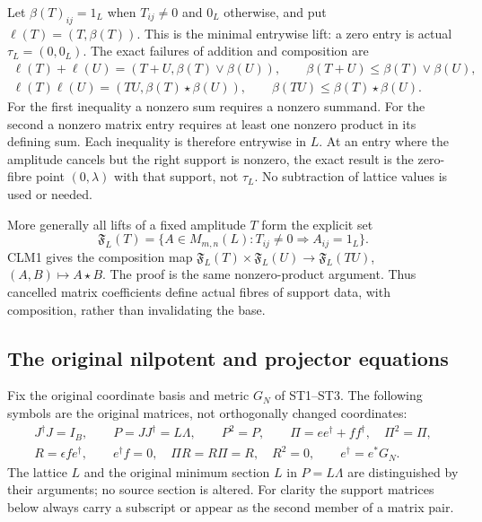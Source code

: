 \documentclass[11pt]{article}
\begin{document}
Let $\beta(T)_{ij}=1_L$ when $T_{ij}\ne0$ and $0_L$ otherwise, and put
$\ell(T)=(T,\beta(T))$. This is the minimal entrywise lift: a zero
entry is actual $\tau_L=(0,0_L)$. The exact failures of addition and
composition are
\begin{equation}\tag{CLM2}
\begin{gathered}
\ell(T)+\ell(U)=(T+U,\beta(T)\vee\beta(U)),\qquad
\beta(T+U)\le\beta(T)\vee\beta(U),\\
\ell(T)\ell(U)=(TU,\beta(T)\star\beta(U)),\qquad
\beta(TU)\le\beta(T)\star\beta(U).
\end{gathered}
\end{equation}
For the first inequality a nonzero sum requires a nonzero summand. For
the second a nonzero matrix entry requires at least one nonzero product
in its defining sum. Each inequality is therefore entrywise in $L$.
At an entry where the amplitude cancels but the right support is nonzero,
the exact result is the zero-fibre point $(0,\lambda)$ with that support,
not $\tau_L$. No subtraction of lattice values is used or needed.

More generally all lifts of a fixed amplitude $T$ form the explicit set
\begin{equation}\tag{CLM3}
\mathfrak F_L(T)=
 \{A\in M_{m,n}(L):T_{ij}\ne0\Rightarrow A_{ij}=1_L\}.
\end{equation}
CLM1 gives the composition map
$\mathfrak F_L(T)\times\mathfrak F_L(U)\to\mathfrak F_L(TU)$,
$(A,B)\mapsto A\star B$. The proof is the same nonzero-product
argument. Thus cancelled matrix coefficients define actual fibres of
support data, with composition, rather than invalidating the base.

\subsection{The original nilpotent and projector equations}

Fix the original coordinate basis and metric $G_N$ of ST1--ST3. The
following symbols are the original matrices, not orthogonally changed
coordinates:
\begin{equation}\tag{CLM4}
\begin{gathered}
J^\dagger J=I_B,\qquad P=JJ^\dagger=L\Lambda,
\qquad P^2=P,\qquad \Pi=ee^\dagger+ff^\dagger,\quad\Pi^2=\Pi,\\
R=\epsilon fe^\dagger,\qquad e^\dagger f=0,\quad
\Pi R=R\Pi=R,\quad R^2=0,\qquad
e^\dagger=e^*G_N.
\end{gathered}
\end{equation}
The lattice $L$ and the original minimum section $L$ in $P=L\Lambda$
are distinguished by their arguments; no source section is altered.
For clarity the support matrices below always carry a subscript or
appear as the second member of a matrix pair.
\end{document}
